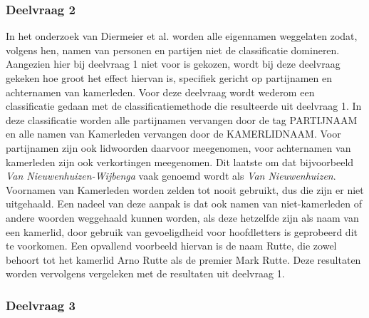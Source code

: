 \subsubsection{Deelvraag 2}
In het onderzoek van Diermeier et al. worden alle eigennamen weggelaten zodat, volgens hen, namen van personen en partijen niet de classificatie domineren. Aangezien hier bij deelvraag 1 niet voor is gekozen, wordt bij deze deelvraag gekeken hoe groot het effect hiervan is, specifiek gericht op partijnamen en achternamen van kamerleden. Voor deze deelvraag wordt wederom een classificatie gedaan met de classificatiemethode die resulteerde uit deelvraag 1. In deze classificatie worden alle partijnamen vervangen door de tag PARTIJNAAM en alle namen van Kamerleden vervangen door de KAMERLIDNAAM. Voor partijnamen zijn ook lidwoorden daarvoor meegenomen, voor achternamen van kamerleden zijn ook verkortingen meegenomen. Dit laatste om dat bijvoorbeeld \textit{Van Nieuwenhuizen-Wijbenga} vaak genoemd wordt als \textit{Van Nieuwenhuizen}. Voornamen van Kamerleden worden zelden tot nooit gebruikt, dus die zijn er niet uitgehaald. Een nadeel van deze aanpak is dat ook namen van niet-kamerleden of andere woorden weggehaald kunnen worden, als deze hetzelfde zijn als naam van een kamerlid, door gebruik van gevoeligdheid voor hoofdletters is geprobeerd dit te voorkomen. Een opvallend voorbeeld hiervan is de naam Rutte, die zowel behoort tot het kamerlid Arno Rutte als de premier Mark Rutte.
Deze resultaten worden vervolgens vergeleken met de resultaten uit deelvraag 1. 

\subsubsection{Deelvraag 3}

